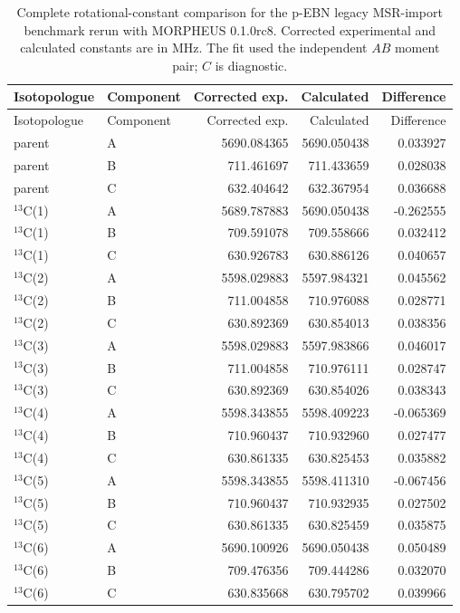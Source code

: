 \small
\begin{longtable}{llrrr}
\caption{Complete rotational-constant comparison for the p-EBN legacy MSR-import benchmark rerun with MORPHEUS 0.1.0rc8. Corrected experimental and calculated constants are in MHz. The fit used the independent $AB$ moment pair; $C$ is diagnostic.}\label{tab:si-p-ebn-rotconstants}\\
\toprule
Isotopologue & Component & Corrected exp. & Calculated & Difference \\
\midrule
\endfirsthead
\toprule
Isotopologue & Component & Corrected exp. & Calculated & Difference \\
\midrule
\endhead
parent & A & 5690.084365 & 5690.050438 & 0.033927 \\
parent & B & 711.461697 & 711.433659 & 0.028038 \\
parent & C & 632.404642 & 632.367954 & 0.036688 \\
$^{13}$C(1) & A & 5689.787883 & 5690.050438 & -0.262555 \\
$^{13}$C(1) & B & 709.591078 & 709.558666 & 0.032412 \\
$^{13}$C(1) & C & 630.926783 & 630.886126 & 0.040657 \\
$^{13}$C(2) & A & 5598.029883 & 5597.984321 & 0.045562 \\
$^{13}$C(2) & B & 711.004858 & 710.976088 & 0.028771 \\
$^{13}$C(2) & C & 630.892369 & 630.854013 & 0.038356 \\
$^{13}$C(3) & A & 5598.029883 & 5597.983866 & 0.046017 \\
$^{13}$C(3) & B & 711.004858 & 710.976111 & 0.028747 \\
$^{13}$C(3) & C & 630.892369 & 630.854026 & 0.038343 \\
$^{13}$C(4) & A & 5598.343855 & 5598.409223 & -0.065369 \\
$^{13}$C(4) & B & 710.960437 & 710.932960 & 0.027477 \\
$^{13}$C(4) & C & 630.861335 & 630.825453 & 0.035882 \\
$^{13}$C(5) & A & 5598.343855 & 5598.411310 & -0.067456 \\
$^{13}$C(5) & B & 710.960437 & 710.932935 & 0.027502 \\
$^{13}$C(5) & C & 630.861335 & 630.825459 & 0.035875 \\
$^{13}$C(6) & A & 5690.100926 & 5690.050438 & 0.050489 \\
$^{13}$C(6) & B & 709.476356 & 709.444286 & 0.032070 \\
$^{13}$C(6) & C & 630.835668 & 630.795702 & 0.039966 \\

\end{longtable}

